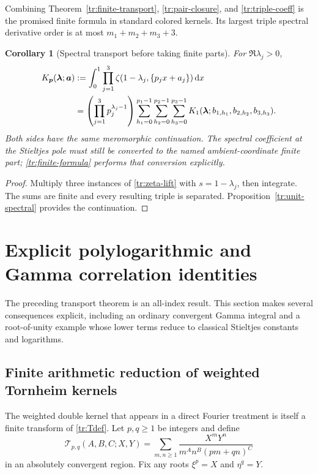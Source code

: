 \documentclass[11pt,a4paper]{article}
\numberwithin{equation}{section}
\newtheorem{corollary}[theorem]{Corollary}
\theoremstyle{definition}
\theoremstyle{remark}
\newcommand{\dd}{\,\mathrm d}
\begin{document}
Combining Theorem~\ref{tr:finite-transport},
\eqref{tr:pair-closure}, and \eqref{tr:triple-coeff} is the promised
finite formula in standard colored kernels. Its largest triple spectral
derivative order is at most $m_1+m_2+m_3+3$.

\begin{corollary}[Spectral transport before taking finite parts]
\label{tr:spectral-lift}
For $\Re\lambda_j>0$,
\begin{align}\label{tr:Kp}
 K_{\boldsymbol p}(\boldsymbol\lambda;\boldsymbol a)
 &:=\int_0^1\prod_{j=1}^3
           \zeta(1-\lambda_j,\{p_jx+a_j\})\dd x\notag\\
 &=\left(\prod_{j=1}^3p_j^{\lambda_j-1}\right)
   \sum_{h_1=0}^{p_1-1}\sum_{h_2=0}^{p_2-1}\sum_{h_3=0}^{p_3-1}
       K_1(\boldsymbol\lambda;b_{1,h_1},b_{2,h_2},b_{3,h_3}).
\end{align}
Both sides have the same meromorphic continuation. The spectral
coefficient at the Stieltjes pole must still be converted to the named
ambient-coordinate finite part; \eqref{tr:finite-formula} performs
that conversion explicitly.
\end{corollary}
\begin{proof}
Multiply three instances of \eqref{tr:zeta-lift} with $s=1-\lambda_j$,
then integrate. The sums are finite and every resulting triple is
separated. Proposition~\ref{tr:unit-spectral} provides the continuation.
\end{proof}


\section{Explicit polylogarithmic and Gamma correlation identities}
\label{tc:section}

The preceding transport theorem is an all-index result. This section
makes several consequences explicit, including an ordinary convergent
Gamma integral and a root-of-unity example whose lower terms reduce to
classical Stieltjes constants and logarithms.

\subsection{Finite arithmetic reduction of weighted Tornheim kernels}
The weighted double kernel that appears in a direct Fourier treatment
is itself a finite transform of \eqref{tr:Tdef}. Let $p,q\geq1$ be
integers and define
\begin{equation}\label{tc:weighted}
 \mathcal T_{p,q}(A,B,C;X,Y)
   =\sum_{m,n\geq1}\frac{X^mY^n}{m^An^B(pm+qn)^C}
\end{equation}
in an absolutely convergent region. Fix any roots $\xi^p=X$ and
$\eta^q=Y$.
\end{document}
